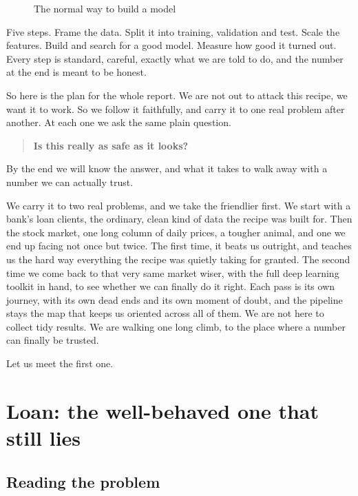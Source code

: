\documentclass[11pt]{article} %
\begin{document}
\begin{figure}[htbp]
\centering

\caption{The normal way to build a model}
\end{figure}


Five steps. Frame the data. Split it into training, validation and test. Scale the features. Build and search for a good model. Measure how good it turned out. Every step is standard, careful, exactly what we are told to do, and the number at the end is meant to be honest.

So here is the plan for the whole report. We are not out to attack this recipe, we want it to work. So we follow it faithfully, and carry it to one real problem after another. At each one we ask the same plain question.


\begin{quote}
\textbf{Is this really as safe as it looks?}
\end{quote}


By the end we will know the answer, and what it takes to walk away with a number we can actually trust.


We carry it to two real problems, and we take the friendlier first. We start with a bank's loan clients, the ordinary, clean kind of data the recipe was built for. Then the stock market, one long column of daily prices, a tougher animal, and one we end up facing not once but twice. The first time, it beats us outright, and teaches us the hard way everything the recipe was quietly taking for granted. The second time we come back to that very same market wiser, with the full deep learning toolkit in hand, to see whether we can finally do it right. Each pass is its own journey, with its own dead ends and its own moment of doubt, and the pipeline stays the map that keeps us oriented across all of them. We are not here to collect tidy results. We are walking one long climb, to the place where a number can finally be trusted.

Let us meet the first one.



\section{Loan: the well-behaved one that still lies}



\subsection{Reading the problem}
\end{document}
